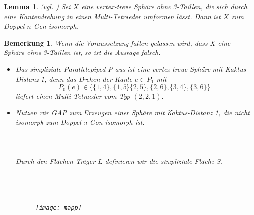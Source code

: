 \documentclass[12pt,titlepage,twoside,cleardoublepage]{article}
\theoremstyle{nummermitklammern}
\newtheorem{lemma}[temp]{Lemma}
\newtheorem{bemerkung}[temp]{Bemerkung}
\newtheorem{lemma}[zahl]{Lemma}
\newtheorem{bemerkung}[zahl]{Bemerkung}
\numberwithin{equation}{section}
\begin{document}
\begin{lemma}{\textsc{(}vgl. \textsc{\cite{simp})}}
Sei $X$ eine vertex-treue Sphäre ohne 3-Taillen, die  sich durch eine Kantendrehung in einen Multi-Tetraeder umformen lässt. Dann ist $X$  zum Doppel-$n$-Gon isomorph.
\end{lemma}
\begin{bemerkung}
Wenn die Voraussetzung fallen gelassen wird, dass $X$ eine Sphäre ohne 3-Taillen ist, so ist die Aussage falsch. 
\begin{itemize}
\item Das simpliziale Parallelepiped $P$ aus  ist eine vertex-treue Sphäre mit Kaktus-Distanz 1, denn das Drehen der Kante $e\in P_1$ mit 
\[
P_0(e)\in\{\{1,4\},\{1,5\}\{2,5\},\{2,6\},\{3,4\},\{3,6\}\}
\] liefert einen Multi-Tetraeder vom Typ $(2,2,1).$
\item Nutzen wir GAP zum Erzeugen einer Sphäre mit Kaktus-Distanz 1, die nicht isomorph zum Doppel n-Gon isomorph ist. \\\\
\fbox{
\parbox{13.4cm}{
\textcolor{red}{$gap>$} \textcolor{blue}{$L:=[[ 2, 3, 5 ], [ 2, 4, 5 ], [ 3, 4, 5 ], [ 1, 3, 6 ], [ 1, 4, 6 ], 
  [ 3, 4, 6 ], [ 1, 7, 8 ], [ 1, 4, 7 ],\newline [ 2, 4, 7 ], [ 2, 7, 8 ], [ 1, 3, 8 ], [ 2, 3, 8 ] ];;$}
  }}\\\\
  Durch den Flächen-Träger $L$ definieren wir die simpliziale Fläche $S$.\\\\
  \\\\
\begin{figure}[H]
\begin{center}
\texttt{[image: mapp]}

\end{center}
\end{figure}
\end{itemize}
\end{bemerkung}
\end{document}
